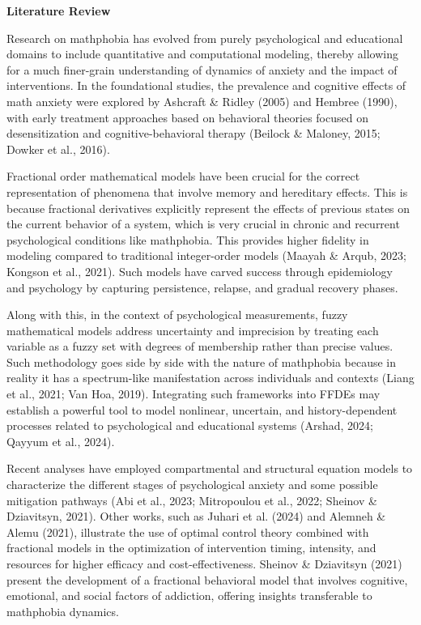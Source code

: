 \textbf{Literature Review}

Research on mathphobia has evolved from purely psychological and educational domains to include quantitative and computational modeling, thereby allowing for a much finer-grain understanding of dynamics of anxiety and the impact of interventions. In the foundational studies, the prevalence and cognitive effects of math anxiety were explored by Ashcraft \& Ridley (2005) and Hembree (1990), with early treatment approaches based on behavioral theories focused on desensitization and cognitive-behavioral therapy (Beilock \& Maloney, 2015; Dowker et al., 2016).

Fractional order mathematical models have been crucial for the correct representation of phenomena that involve memory and hereditary effects. This is because fractional derivatives explicitly represent the effects of previous states on the current behavior of a system, which is very crucial in chronic and recurrent psychological conditions like mathphobia. This provides higher fidelity in modeling compared to traditional integer-order models (Maayah \& Arqub, 2023; Kongson et al., 2021). Such models have carved success through epidemiology and psychology by capturing persistence, relapse, and gradual recovery phases.

Along with this, in the context of psychological measurements, fuzzy mathematical models address uncertainty and imprecision by treating each variable as a fuzzy set with degrees of membership rather than precise values. Such methodology goes side by side with the nature of mathphobia because in reality it has a spectrum-like manifestation across individuals and contexts (Liang et al., 2021; Van Hoa, 2019). Integrating such frameworks into FFDEs may establish a powerful tool to model nonlinear, uncertain, and history-dependent processes related to psychological and educational systems (Arshad, 2024; Qayyum et al., 2024).

Recent analyses have employed compartmental and structural equation models to characterize the different stages of psychological anxiety and some possible mitigation pathways (Abi et al., 2023; Mitropoulou et al., 2022; Sheinov \& Dziavitsyn, 2021). Other works, such as Juhari et al. (2024) and Alemneh \& Alemu (2021), illustrate the use of optimal control theory combined with fractional models in the optimization of intervention timing, intensity, and resources for higher efficacy and cost-effectiveness. Sheinov \& Dziavitsyn (2021) present the development of a fractional behavioral model that involves cognitive, emotional, and social factors of addiction, offering insights transferable to mathphobia dynamics.

